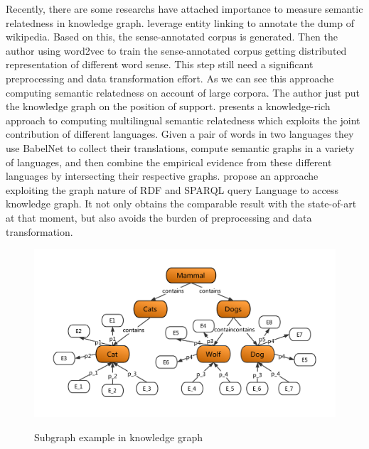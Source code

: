 Recently, there are some researchs have attached importance to measure semantic relatedness
in knowledge graph\cite{aaai/Pirro12, aaai/NavigliP12, acl/IacobacciPN15}. 
\cite{acl/IacobacciPN15} leverage entity linking to annotate the dump of wikipedia. Based on this,
the sense-annotated corpus is generated. Then the author using word2vec to
train the sense-annotated corpus getting distributed representation of different 
word sense. This step still need a significant preprocessing and data transformation effort. 
As we can see this approache computing semantic relatedness on account of large corpora.
The author just put the knowledge graph on the position of support. 
\cite{aaai/NavigliP12} presents a knowledge-rich approach to computing multilingual semantic
relatedness which exploits the joint contribution of different languages. Given a pair of words 
in two languages they use BabelNet to collect their translations, compute semantic
graphs in a variety of languages, and then combine the empirical evidence from these 
different languages by intersecting their respective graphs.
\cite{aaai/Pirro12} propose an approache exploiting the graph nature of RDF and SPARQL query
Language to access knowledge graph. It not only obtains the comparable
result with the state-of-art at that moment, but also avoids the burden
of preprocessing and data transformation.

\begin{figure}
    \centering
    \includegraphics[width=1.0\textwidth]{pic/weak1.pdf}\\
    \caption{Subgraph example in knowledge graph}
    \label{weak1}
\end{figure}


